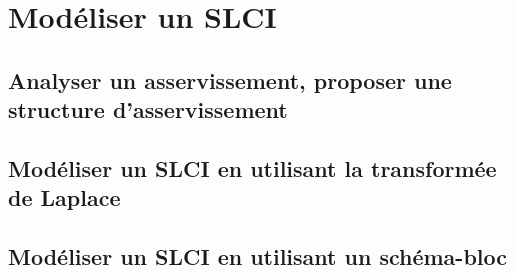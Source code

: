 \setchapterpreamble[u]{\margintoc} 
\chapter{Modéliser un SLCI} 
\section{Analyser un asservissement, proposer une structure d'asservissement} 
\section{Modéliser un SLCI en utilisant la transformée de Laplace} 
\graphicspath{{\repStyle/png/}{../SLCI/SLCI-02-FT/51_MCC/images/}} 
 
 
\section{Modéliser un SLCI en utilisant un schéma-bloc} 
\graphicspath{{\repStyle/png/}{../SLCI/SLCI-03-SchemaBlocs/39_SeineMusicale/images/}} 
 
 
\graphicspath{{\repStyle/png/}{../SLCI/SLCI-03-SchemaBlocs/47_SysReeduc/images/}} 
 
 
\graphicspath{{\repStyle/png/}{../SLCI/SLCI-03-SchemaBlocs/48_Quille/images/}} 
 
 
\graphicspath{{\repStyle/png/}{../SLCI/SLCI-03-SchemaBlocs/500_Divers/images/}} 
 
 
\graphicspath{{\repStyle/png/}{../SLCI/SLCI-03-SchemaBlocs/505_Divers/images/}} 
 
 
\graphicspath{{\repStyle/png/}{../SLCI/SLCI-03-SchemaBlocs/512_Divers/images/}} 
 
 
\graphicspath{{\repStyle/png/}{../SLCI/SLCI-03-SchemaBlocs/51_MCC/images/}} 
 
 
\graphicspath{{\repStyle/png/}{../SLCI/SLCI-03-SchemaBlocs/52_Verin/images/}} 
 
 
\graphicspath{{\repStyle/png/}{../SLCI/SLCI-03-SchemaBlocs/53_BancEpreuveHydraulique/images/}} 
 
 
